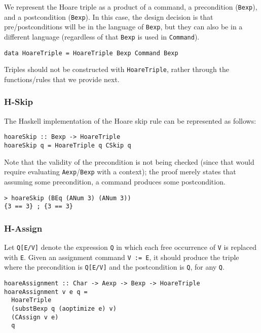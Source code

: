 \documentclass{article}
\begin{document}
We represent the Hoare triple as a product of a command, a precondition (\texttt{Bexp}), and a postcondition (\texttt{Bexp}). In this case, the design decision is that pre/postconditions will be in the language of \texttt{Bexp}, but they can also be in a different language (regardless of that \texttt{Bexp} is used in \texttt{Command}).

\begin{lstlisting}
data HoareTriple = HoareTriple Bexp Command Bexp
\end{lstlisting}

Triples should not be constructed with \texttt{HoareTriple}, rather through the functions/rules that we provide next.

\subsubsection{H-Skip}

The Haskell implementation of the Hoare skip rule can be represented as follows:

\begin{lstlisting}
hoareSkip :: Bexp -> HoareTriple
hoareSkip q = HoareTriple q CSkip q
\end{lstlisting}

Note that the validity of the precondition is not being checked (since that would require evaluating \texttt{Aexp}/\texttt{Bexp} with a context); the proof merely states that assuming some precondition, a command produces some postcondition.

\begin{lstlisting}
> hoareSkip (BEq (ANum 3) (ANum 3))
{3 == 3} ; {3 == 3}
\end{lstlisting}

\subsubsection{H-Assign}

Let \texttt{Q[E/V]} denote the expression \texttt{Q} in which each free occurrence of \texttt{V} is replaced with \texttt{E}. Given an assignment command \texttt{V := E}, it should produce the triple where the precondition is \texttt{Q[E/V]} and the postcondition is \texttt{Q}, for any \texttt{Q}.

\begin{lstlisting}
hoareAssignment :: Char -> Aexp -> Bexp -> HoareTriple
hoareAssignment v e q =
  HoareTriple
  (substBexp q (aoptimize e) v)
  (CAssign v e)
  q
\end{lstlisting}
\end{document}
